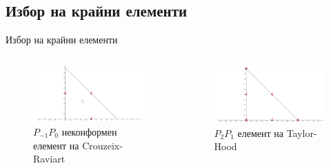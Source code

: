 \documentclass{beamer}
\begin{document}
   
    \subsection{Избор на крайни елементи}
    \begin{frame}{Избор на крайни елементи}
\begin{columns} 
    \begin{column}{.5\textwidth}
        \begin{figure}[H]
  \centering
  \includegraphics[width=\textwidth]{../Figures/01_introduction/cr_element.pdf}
  \caption{$P_{-1}P_0$ неконформен елемент на Crouzeix-Raviart}
\end{figure}
    \end{column}
    \begin{column}{.5\textwidth}
\begin{figure}[H]
  \centering
  \includegraphics[width=\textwidth]{../Figures/01_introduction/tylor_hood_element.pdf}
  \caption{$P_2P_1$ елемент на Taylor-Hood}
\end{figure}
    \end{column}%

\end{columns}
    \end{frame}
    
\end{document}
